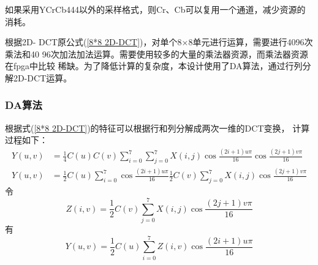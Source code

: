 \documentclass{article}
\numberwithin {equation}{section}
\begin{document}
\begin{spacing}{1.25}
    如果采用YCrCb444以外的采样格式，则Cr、Cb可以复用一个通道，减少资源的消耗。
    
    根据2D-
    DCT原公式(\ref{8*8 2D-DCT})，对单个8×8单元进行运算，需要进行4096次乘法和40
    96次加法加法运算。需要使用较多的大量的乘法器资源，而乘法器资源在fpga中比较
    稀缺。为了降低计算的复杂度，本设计使用了DA算法，通过行列分解2D-DCT运算。
      \subsubsection{DA算法}
        \vspace{1em}
        根据式(\ref{8*8 2D-DCT})的特征可以根据行和列分解成两次一维的DCT变换，
        计算过程如下：
        \begin{equation*}
          \begin{aligned}
            Y(u,v)&=\frac{1}{4}C(u)C(v)\sum_{i=0}^{7}\sum_{j=0}^{7}X(i,j)
            \cos\frac{(2i+1)u\pi}{16}\cos\frac{(2j+1)v\pi}{16}\\
            Y(u,v)&=\frac{1}{2}C(u)\sum_{i=0}^{7}\cos\frac{(2i+1)u\pi}{16}
            \frac{1}{2}C(v)\sum_{j=0}^{7}X(i,j)\cos\frac{(2j+1)v\pi}{16}
          \end{aligned}
        \end{equation*}
        令
        \begin{equation}
          Z(i,v)=\frac{1}{2}C(v)\sum_{j=0}^{7}X(i,j)\cos\frac{(2j+1)v\pi}{16}
          \label{colDCT}
        \end{equation}
        有
        \begin{equation} 
          Y(u,v)=\frac{1}{2}C(u)\sum_{i=0}^{7}
          Z(i,v)\cos\frac{(2i+1)u\pi}{16}
          \label{rowDCT}
        \end{equation}


\end{spacing}
\end{document}
